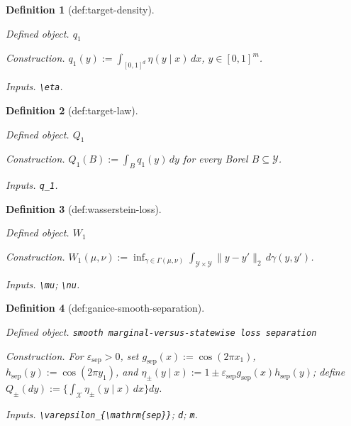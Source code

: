\documentclass{article}
\newtheorem{definition}{Definition}
\begin{document}
\begin{definition}[def:target-density]\label{def:target-density}
\par\smallskip\noindent\emph{Defined object.} \(q_1\)
\par\smallskip\noindent\emph{Construction.} \(q_1(y):=\int_{[0,1]^d}\eta(y\mid x)\,dx\), \(y\in[0,1]^m\).
\par\smallskip\noindent\emph{Inputs.} \texttt{\textbackslash{}\allowbreak{}eta}.
\end{definition}

\begin{definition}[def:target-law]\label{def:target-law}
\par\smallskip\noindent\emph{Defined object.} \(Q_1\)
\par\smallskip\noindent\emph{Construction.} \(Q_1(B):=\int_B q_1(y)\,dy\) for every Borel \(B\subseteq\mathcal Y\).
\par\smallskip\noindent\emph{Inputs.} \texttt{q\_\allowbreak{}1}.
\end{definition}

\begin{definition}[def:wasserstein-loss]\label{def:wasserstein-loss}
\par\smallskip\noindent\emph{Defined object.} \(W_1\)
\par\smallskip\noindent\emph{Construction.} \(W_1(\mu,\nu):=\inf_{\gamma\in\Gamma(\mu,\nu)}\int_{\mathcal Y\times\mathcal Y}\lVert y-y'\rVert_2\,d\gamma(y,y')\).
\par\smallskip\noindent\emph{Inputs.} \texttt{\textbackslash{}\allowbreak{}mu}; \texttt{\textbackslash{}\allowbreak{}nu}.
\end{definition}

\begin{definition}[def:ganice-smooth-separation]\label{def:ganice-smooth-separation}
\par\smallskip\noindent\emph{Defined object.} \texttt{smooth marginal-\allowbreak{}versus-\allowbreak{}statewise loss separation}
\par\smallskip\noindent\emph{Construction.} For \(\varepsilon_{\mathrm{sep}}>0\), set \(g_{\mathrm{sep}}(x):=\cos(2\pi x_1)\), \(h_{\mathrm{sep}}(y):=\cos(2\pi y_1)\), and \(\eta_{\pm}(y\mid x):=1\pm\varepsilon_{\mathrm{sep}}g_{\mathrm{sep}}(x)h_{\mathrm{sep}}(y)\); define \(Q_{\pm}(dy):=\{\int_{\mathcal X}\eta_{\pm}(y\mid x)\,dx\}dy\).
\par\smallskip\noindent\emph{Inputs.} \texttt{\textbackslash{}\allowbreak{}varepsilon\_\allowbreak{}\{\textbackslash{}\allowbreak{}mathrm\{sep\}\allowbreak{}\}\allowbreak{}}; \texttt{d}; \texttt{m}.
\end{definition}
\end{document}
